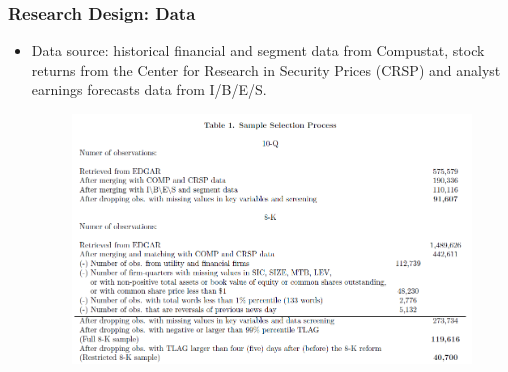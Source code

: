 \documentclass{beamer}
\begin{document}
\begin{frame}
\frametitle{Research Design: Data}

\begin{itemize}
	\item Data source: historical financial and segment data from Compustat, stock returns from the Center for Research in Security Prices (CRSP) and analyst earnings forecasts data from I/B/E/S.
	
	\begin{figure}[h]
		\centering
		\includegraphics[width=0.8\linewidth]{tab1}
		\label{tab1}
	\end{figure}

\end{itemize}
\end{frame}
\end{document}
